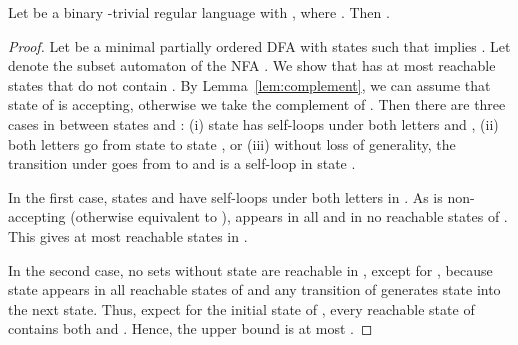 \documentclass[runningheads]{llncs}
\newcommand{\R}{}
\begin{document}
  \begin{lemma}\label{lem:binaryRtriv_upper}
    Let  be a binary \R-trivial regular language with , where .
    Then . 
  \end{lemma}
  \begin{proof}
    Let  be a minimal partially ordered DFA
    with  states such that  implies . 
    Let  denote the subset automaton of the NFA .
    We show that  has at most  reachable states that do not contain . 
    By Lemma~\ref{lem:complement}, we can assume that state  of  is accepting,    
    otherwise we take the complement of . 
    Then there are three cases in  between states  and :
    (i)   state  has self-loops under both letters  and ,
    (ii)  both letters  go from state  to state , or
    (iii) without loss of generality, the transition under  goes from  to  and  is a self-loop in state .

    In the first case, 
states  and  have self-loops under both letters in .
    As  is non-accepting (otherwise equivalent to ),  appears in all and  in no reachable states of .
    This gives at most  reachable states in .
    
    In the second case,
    no sets without state  are reachable in , except for , 
    because state  appears in all reachable states of  and 
    any transition of  generates state  into the next state.
    Thus, expect for the initial state  of , every reachable state of  contains both  and .
    Hence, the upper bound is at most .


\end{proof}
\end{document}
